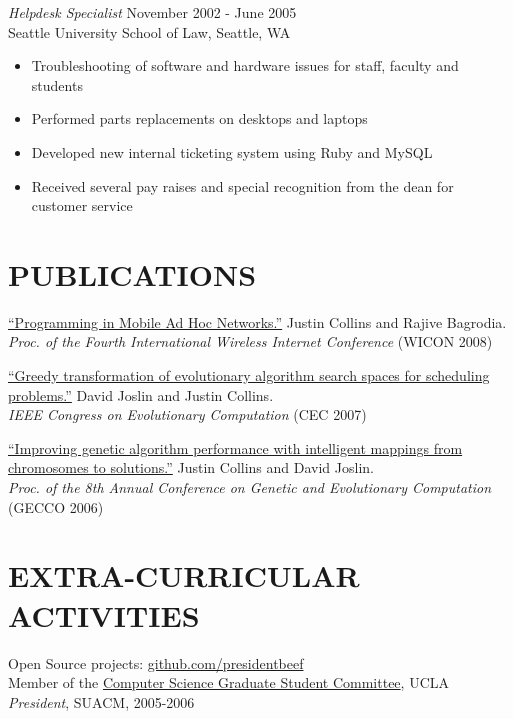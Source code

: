 \documentclass[margin]{res}
\begin{document}
\begin{resume}
		{\sl Helpdesk Specialist} \hfill November 2002 - June 2005 \\
                Seattle University School of Law, Seattle, WA 
                 \begin{itemize}  \itemsep -2pt %
                \item Troubleshooting of software and hardware issues for staff, faculty and students
		\item Performed parts replacements on desktops and laptops
		\item Developed new internal ticketing system using Ruby and MySQL
		\item Received several pay raises and special recognition from the dean for customer service
                \end{itemize}

\section{PUBLICATIONS}
		\href{http://cs.ucla.edu/~collins/documents/Justin_Collins-WICON08.pdf}{``Programming in Mobile Ad Hoc Networks.''} Justin Collins and Rajive Bagrodia. \\
		{\it Proc. of the Fourth International Wireless Internet Conference} (WICON 2008)

		\href{http://cs.ucla.edu/~collins/documents/Joslin_Collins-Greedy_Transformations_of_Search_Spaces.pdf}{``Greedy transformation of evolutionary algorithm search spaces for scheduling problems.''} David Joslin and Justin Collins.\\
		{\it IEEE Congress on Evolutionary Computation} (CEC 2007)

		\href{http://cs.ucla.edu/~collins/documents/Collins_Joslin-GECCO06-abstract.pdf}{``Improving genetic algorithm performance with intelligent mappings from chromosomes to solutions.''} Justin Collins and David Joslin. \\
		{\it Proc. of the 8th Annual Conference on Genetic and Evolutionary Computation} (GECCO 2006)

\section{EXTRA-CURRICULAR \\ ACTIVITIES}             
            Open Source projects: \href{http://github.com/presidentbeef}{github.com/presidentbeef}\\
	    Member of the \href{http://csgsc.cs.ucla.edu/}{Computer Science Graduate Student Committee}, UCLA \\
            {\it President}, SUACM, 2005-2006

\end{resume}
\end{document}

